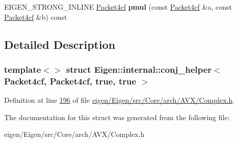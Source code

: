 \begin{DoxyCompactItemize}
\item 
\mbox{\label{struct_eigen_1_1internal_1_1conj__helper_3_01_packet4cf_00_01_packet4cf_00_01true_00_01true_01_4_aaaa36dbafeef9a405bbd0dead0fa4d9d}} 
E\+I\+G\+E\+N\+\_\+\+S\+T\+R\+O\+N\+G\+\_\+\+I\+N\+L\+I\+NE \hyperlink{struct_eigen_1_1internal_1_1_packet4cf}{Packet4cf} {\bfseries pmul} (const \hyperlink{struct_eigen_1_1internal_1_1_packet4cf}{Packet4cf} \&a, const \hyperlink{struct_eigen_1_1internal_1_1_packet4cf}{Packet4cf} \&b) const
\end{DoxyCompactItemize}


\subsection{Detailed Description}
\subsubsection*{template$<$$>$\newline
struct Eigen\+::internal\+::conj\+\_\+helper$<$ Packet4cf, Packet4cf, true, true $>$}



Definition at line \hyperlink{eigen_2_eigen_2src_2_core_2arch_2_a_v_x_2_complex_8h_source_l00196}{196} of file \hyperlink{eigen_2_eigen_2src_2_core_2arch_2_a_v_x_2_complex_8h_source}{eigen/\+Eigen/src/\+Core/arch/\+A\+V\+X/\+Complex.\+h}.



The documentation for this struct was generated from the following file\+:\begin{DoxyCompactItemize}
\item 
eigen/\+Eigen/src/\+Core/arch/\+A\+V\+X/\+Complex.\+h\end{DoxyCompactItemize}
